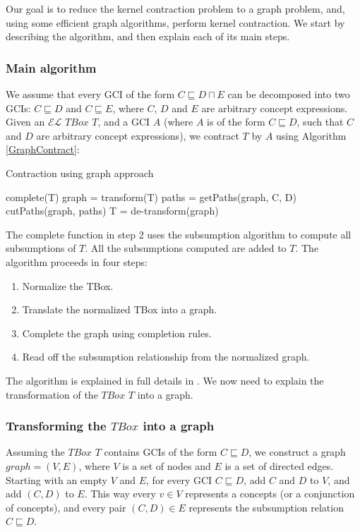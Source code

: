 Our goal is to reduce the kernel contraction problem to a graph problem, and, using some efficient graph algorithms, perform kernel contraction. We start by describing the algorithm, and then explain each of its main steps.

\subsubsection{Main algorithm}
We assume that every GCI of the form $C \sqsubseteq D \sqcap E$ can be decomposed into two GCIs: $C \sqsubseteq D$ and $C \sqsubseteq E$, where $C$, $D$ and $E$ are arbitrary concept expressions. Given an $\mathcal{EL}$ $TBox$ $T$, and a GCI $A$ (where $A$ is of the form $C \sqsubseteq D$, such that $C$ and $D$ are arbitrary concept expressions), we contract $T$ by $A$ using Algorithm \ref{GraphContract}:

\begin{algorithm}
\caption{Contraction using graph approach}
\label{GraphContract}
\begin{algorithmic}[1]
\State complete(T)
\State graph = transform(T)
\State paths = getPaths(graph, C, D)
\State cutPaths(graph, paths)
\State T = de-transform(graph)
\EndFunction
\end{algorithmic}
\end{algorithm}

The complete function in step 2 uses the subsumption algorithm to compute all subsumptions of $T$. All the subsumptions computed are added to $T$. The algorithm proceeds in four steps:
\begin{enumerate}
\item Normalize the TBox.
\item Translate the normalized TBox into a graph.
\item Complete the graph using completion rules.
\item Read off the subsumption relationship from the normalized graph.\cite{new}
\end{enumerate}
The algorithm is explained in full details in \cite{new}. We now need to explain the transformation of the $TBox$ $T$ into a graph.

\subsubsection{Transforming the $TBox$ into a graph}
Assuming the $TBox$ $T$ contains GCIs of the form $C \sqsubseteq D$, we construct a graph $graph=(V, E)$, where $V$ is a set of nodes and $E$ is a set of directed edges. Starting with an empty $V$ and $E$, for every GCI $C \sqsubseteq D$, add $C$ and $D$ to $V$, and add $(C, D)$ to $E$. This way every $v \in V$ represents a concepts (or a conjunction of concepts), and every pair $(C, D) \in E$ represents the subsumption relation $C \sqsubseteq D$.

